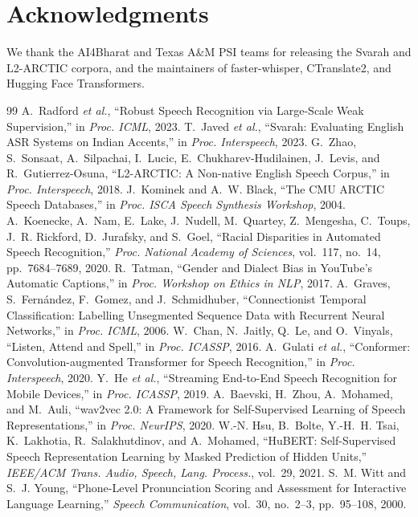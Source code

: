 \documentclass[conference]{IEEEtran}
\begin{document}
\section*{Acknowledgments}
We thank the AI4Bharat and Texas A\&M PSI teams for releasing the Svarah and L2-ARCTIC corpora, and the maintainers of faster-whisper, CTranslate2, and Hugging Face Transformers.

\begin{thebibliography}{99}
 A.~Radford \emph{et al.}, ``Robust Speech Recognition via Large-Scale Weak Supervision,'' in \emph{Proc. ICML}, 2023.
 T.~Javed \emph{et al.}, ``Svarah: Evaluating English ASR Systems on Indian Accents,'' in \emph{Proc. Interspeech}, 2023.
 G.~Zhao, S.~Sonsaat, A.~Silpachai, I.~Lucic, E.~Chukharev-Hudilainen, J.~Levis, and R.~Gutierrez-Osuna, ``L2-ARCTIC: A Non-native English Speech Corpus,'' in \emph{Proc. Interspeech}, 2018.
 J.~Kominek and A.~W. Black, ``The CMU ARCTIC Speech Databases,'' in \emph{Proc. ISCA Speech Synthesis Workshop}, 2004.
 A.~Koenecke, A.~Nam, E.~Lake, J.~Nudell, M.~Quartey, Z.~Mengesha, C.~Toups, J.~R. Rickford, D.~Jurafsky, and S.~Goel, ``Racial Disparities in Automated Speech Recognition,'' \emph{Proc. National Academy of Sciences}, vol.~117, no.~14, pp.~7684--7689, 2020.
 R.~Tatman, ``Gender and Dialect Bias in YouTube's Automatic Captions,'' in \emph{Proc. Workshop on Ethics in NLP}, 2017.
 A.~Graves, S.~Fern\'andez, F.~Gomez, and J.~Schmidhuber, ``Connectionist Temporal Classification: Labelling Unsegmented Sequence Data with Recurrent Neural Networks,'' in \emph{Proc. ICML}, 2006.
 W.~Chan, N.~Jaitly, Q.~Le, and O.~Vinyals, ``Listen, Attend and Spell,'' in \emph{Proc. ICASSP}, 2016.
 A.~Gulati \emph{et al.}, ``Conformer: Convolution-augmented Transformer for Speech Recognition,'' in \emph{Proc. Interspeech}, 2020.
 Y.~He \emph{et al.}, ``Streaming End-to-End Speech Recognition for Mobile Devices,'' in \emph{Proc. ICASSP}, 2019.
 A.~Baevski, H.~Zhou, A.~Mohamed, and M.~Auli, ``wav2vec 2.0: A Framework for Self-Supervised Learning of Speech Representations,'' in \emph{Proc. NeurIPS}, 2020.
 W.-N. Hsu, B.~Bolte, Y.-H.~H. Tsai, K.~Lakhotia, R.~Salakhutdinov, and A.~Mohamed, ``HuBERT: Self-Supervised Speech Representation Learning by Masked Prediction of Hidden Units,'' \emph{IEEE/ACM Trans. Audio, Speech, Lang. Process.}, vol.~29, 2021.
 S.~M. Witt and S.~J. Young, ``Phone-Level Pronunciation Scoring and Assessment for Interactive Language Learning,'' \emph{Speech Communication}, vol.~30, no.~2--3, pp.~95--108, 2000.

\end{thebibliography}
\end{document}
